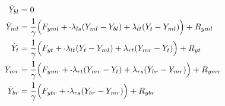 \documentclass[11pt, landscape]{article}
\newcommand{\mn}{\scalebox{0.7}[1.0]{-}}
\begin{document}
\begin{align}  
  \dot{Y}_{bl} &= 0 \\
  \dot{Y}_{ml} &= \frac{1}{\gamma} \Big(F_{yml} + \mn \lambda_{ls}(Y_{ml} - Y_{bl}) + \lambda_{lt}(Y_{t } - Y_{ml}) \Big) + R_{yml} \\
  \dot{Y}_{t}  &= \frac{1}{\gamma} \Big(F_{yt } + \mn \lambda_{lt}(Y_{t } - Y_{ml}) + \lambda_{rt}(Y_{mr} - Y_{t }) \Big) + R_{yt } \\
  \dot{Y}_{mr} &= \frac{1}{\gamma} \Big(F_{ymr} + \mn \lambda_{rt}(Y_{mr} - Y_{t }) + \lambda_{rs}(Y_{br} - Y_{mr}) \Big) + R_{ymr} \\
  \dot{Y}_{br} &= \frac{1}{\gamma} \Big(F_{ybr} + \mn \lambda_{rs}(Y_{br} - Y_{mr})                                 \Big) + R_{ybr}
\end{align}
\end{document}
